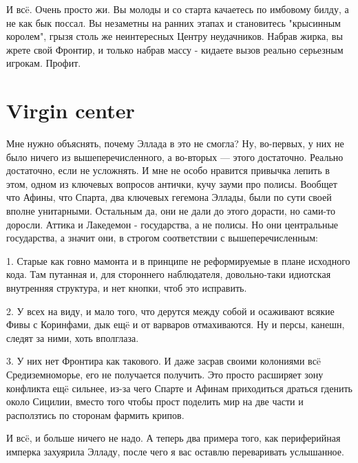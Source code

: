 И всë. Очень просто жи. Вы молоды и со старта качаетесь по имбовому билду, а не как бык поссал. Вы незаметны на ранних этапах и становитесь "крысинным королем", грызя столь же неинтересных Центру неудачников. Набрав жирка, вы жрете свой Фронтир, и только набрав массу - кидаете вызов реально серьезным игрокам. Профит.

\section{Virgin center}
Мне нужно объяснять, почему Эллада в это не смогла? Ну, во-первых, у них не было ничего из вышеперечисленного, а во-вторых — этого достаточно. Реально достаточно, если не усложнять. И мне не особо нравится привычка лепить в этом, одном из ключевых вопросов антички, кучу зауми про полисы. Вообщет что Афины, что Спарта, два ключевых гегемона Эллады, были по сути своей вполне унитарными. Остальным да, они не дали до этого дорасти, но сами-то доросли. Аттика и Лакедемон - государства, а не полисы. Но они центральные государства, а значит они, в строгом соответствии с вышеперечисленным:


1. Старые как говно мамонта и в принципе не реформируемые в плане исходного кода. Там путанная и, для стороннего наблюдателя, довольно-таки идиотская внутренняя структура, и нет кнопки, чтоб это исправить.


2. У всех на виду, и мало того, что дерутся между собой и осаживают всякие Фивы с Коринфами, дык ещë и от варваров отмахиваются. Ну и персы, канешн, следят за ними, хоть вполглаза.


3. У них нет Фронтира как такового. И даже засрав своими колониями всë Средиземноморье, его не получается получить. Это просто расширяет зону конфликта ещë сильнее, из-за чего Спарте и Афинам приходиться драться гденить около Сицилии, вместо того чтобы прост поделить мир на две части и расползтись по сторонам фармить крипов.


И всë, и больше ничего не надо. А теперь два примера того, как периферийная имперка захуярила Элладу, после чего я вас оставлю переваривать услышанное. 


